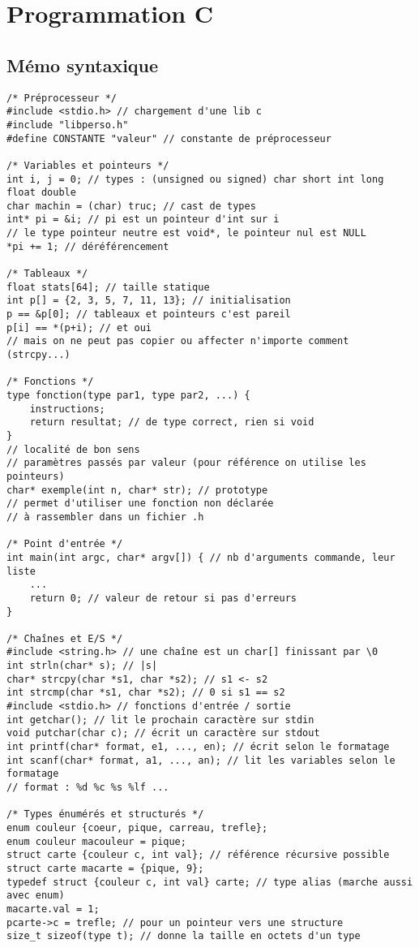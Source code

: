 \documentclass[a4paper]{article}
\begin{document}
\section{Programmation C}

\subsection{Mémo syntaxique}

\begin{lstlisting}
/* Préprocesseur */
#include <stdio.h> // chargement d'une lib c
#include "libperso.h"
#define CONSTANTE "valeur" // constante de préprocesseur

/* Variables et pointeurs */
int i, j = 0; // types : (unsigned ou signed) char short int long float double
char machin = (char) truc; // cast de types
int* pi = &i; // pi est un pointeur d'int sur i
// le type pointeur neutre est void*, le pointeur nul est NULL
*pi += 1; // déréférencement

/* Tableaux */
float stats[64]; // taille statique
int p[] = {2, 3, 5, 7, 11, 13}; // initialisation
p == &p[0]; // tableaux et pointeurs c'est pareil
p[i] == *(p+i); // et oui
// mais on ne peut pas copier ou affecter n'importe comment (strcpy...)

/* Fonctions */
type fonction(type par1, type par2, ...) {
    instructions;
    return resultat; // de type correct, rien si void
}
// localité de bon sens
// paramètres passés par valeur (pour référence on utilise les pointeurs)
char* exemple(int n, char* str); // prototype
// permet d'utiliser une fonction non déclarée
// à rassembler dans un fichier .h

/* Point d'entrée */
int main(int argc, char* argv[]) { // nb d'arguments commande, leur liste
    ...
    return 0; // valeur de retour si pas d'erreurs
}

/* Chaînes et E/S */
#include <string.h> // une chaîne est un char[] finissant par \0
int strln(char* s); // |s|
char* strcpy(char *s1, char *s2); // s1 <- s2
int strcmp(char *s1, char *s2); // 0 si s1 == s2
#include <stdio.h> // fonctions d'entrée / sortie
int getchar(); // lit le prochain caractère sur stdin
void putchar(char c); // écrit un caractère sur stdout
int printf(char* format, e1, ..., en); // écrit selon le formatage
int scanf(char* format, a1, ..., an); // lit les variables selon le formatage
// format : %d %c %s %lf ...

/* Types énumérés et structurés */
enum couleur {coeur, pique, carreau, trefle};
enum couleur macouleur = pique;
struct carte {couleur c, int val}; // référence récursive possible
struct carte macarte = {pique, 9};
typedef struct {couleur c, int val} carte; // type alias (marche aussi avec enum)
macarte.val = 1;
pcarte->c = trefle; // pour un pointeur vers une structure
size_t sizeof(type t); // donne la taille en octets d'un type


\end{lstlisting}
\end{document}
